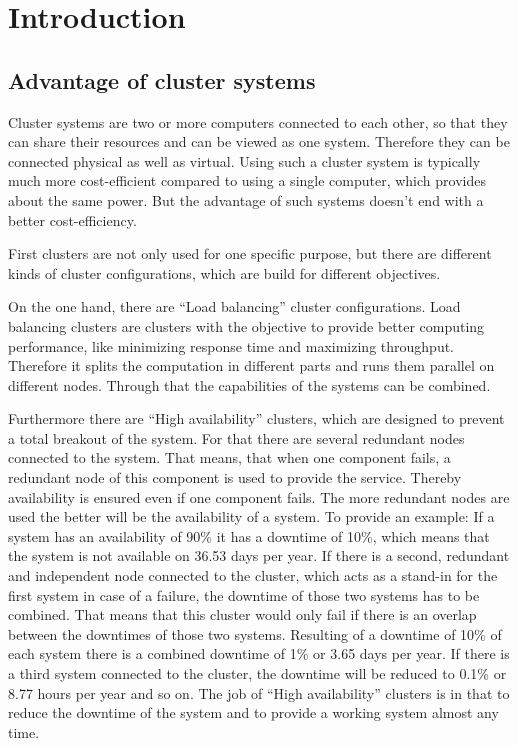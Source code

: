 
\chapter{Introduction}

\section{Advantage of cluster systems}

Cluster systems are two or more computers connected to each other, so that they can share their resources and can be viewed as one system. Therefore they can be connected physical as well as virtual. Using such a cluster system is typically much more cost-efficient compared to using a single computer, which provides about the same power. But the advantage of such systems doesn't end with a better cost-efficiency.


First clusters are not only used for one specific purpose, but there are different kinds of cluster configurations, which are build for different objectives.

On the one hand, there are ``Load balancing'' cluster configurations. Load balancing clusters are clusters with the objective to provide better computing performance, like minimizing response time and maximizing throughput.  Therefore it splits the computation in different parts and runs them parallel on different nodes. Through that the capabilities of the systems can be combined.


Furthermore there are ``High availability'' clusters, which are designed to prevent a total breakout of the system. For that there are several redundant nodes connected to the system. That means, that when one component fails, a redundant node of this component is used to provide the service. Thereby availability is ensured even if one component fails. The more redundant nodes are used the better will be the availability of a system. To provide an example: If a system has an availability of 90\% it has a downtime of 10\%, which means that the system is not available on 36.53 days per year. If there is a second, redundant and independent node connected to the cluster, which acts as a stand-in for the first system in case of a failure, the downtime of those two systems has to be combined. That means that this cluster would only fail if there is an overlap between the downtimes of those two systems. Resulting of a downtime of 10\% of each system there is a combined downtime of 1\% or 3.65 days per year. If there is a third system connected to the cluster, the downtime will be reduced to 0.1\% or 8.77 hours per year and so on. The job of ``High availability'' clusters is in that to reduce the downtime of the system and to provide a working system almost any time.

